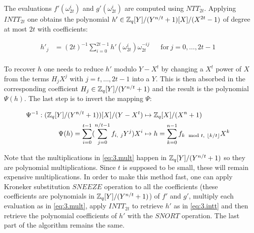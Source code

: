 The evaluations $f'(\omega_{2t}^i)$ and $g'(\omega_{2t}^i)$ are computed using $NTT_{2t}$. Applying $INTT_{2t}$ one obtains the polynomial $h' \in \mathbb{Z}_q[Y]/(Y^{n/t} + 1)[X]/(X^{2t} - 1)$ of degree at most $2t$ with coefficients:

\begin{align}\label{eq:3.intt}
    h'_j &= (2t)^{-1} \sum_{i=0}^{2t-1} h'(\omega_{2t}^i) \omega_{2t}^{-ij}  && \text{for}\ j = 0, \ldots, 2t-1 \\
\end{align}

To recover $h$ one needs to reduce $h'$ modulo $Y - X^t$ by changing a $X^t$ power of $X$ from the terms $H_j X^j$ with $j=t, \ldots, 2t-1$ into a $Y$. This is then absorbed in the corresponding coefficient $H_j \in \mathbb{Z}_q[Y]/(Y^{n/t} + 1)$ and the result is the polynomial $\Psi(h)$. The last step is to invert the mapping $\Psi$:

\begin{align*}
    \Psi^{-1} : (\mathbb{Z}_q[Y]/(Y^{n/t} + 1))[X] / (Y - X^t) &\mapsto \mathbb{Z}_q[X]/(X^n + 1) \\
    \Psi(h) = \sum_{i=0}^{t-1}(\sum_{j=0}^{n/t-1} f_{i,\ j} Y^j) X^i &\mapsto h = \sum_{k=0}^{n-1} f_{k \mod t,\ \left \lfloor{k/t}\right \rfloor } X^k
\end{align*}

Note that the multiplications in \cref{eq:3.mult} happen in $\mathbb{Z}_q[Y]/(Y^{n/t} + 1)$ so they are polynomial multiplications. Since $t$ is supposed to be small, these will remain expensive multiplications. In order to make this method fast, one can apply Kroneker substitution $SNEEZE$ operation to all the coefficients (these coefficients are polynomials in $\mathbb{Z}_q[Y]/(Y^{n/t} + 1)$) of $f'$ and $g'$, multiply each evaluation as in \cref{eq:3.mult}, apply $INTT_{2t}$ to retrieve $h'$ as in \cref{eq:3.intt} and then retrieve the polynomial coefficients of $h'$ with the $SNORT$ operation. The last part of the algorithm remains the same.